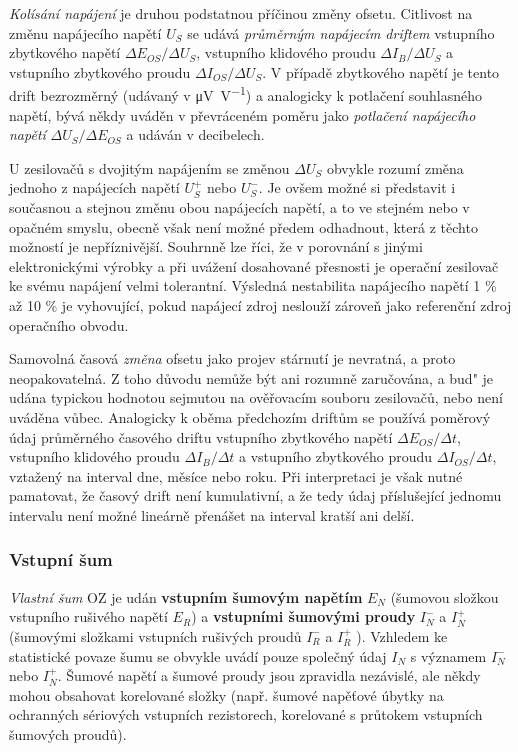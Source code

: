         \emph{Kolísání napájení} je druhou podstatnou příčinou změny ofsetu. Citlivost na změnu
        napájecího napětí \(U_S\) se udává \emph{průměrným napájecím driftem} vstupního zbytkového
        napětí \(\Delta E_{OS}/\Delta U_S\), vstupního klidového proudu \(\Delta I_B/\Delta U_S\) a
        vstupního zbytkového proudu \(\Delta I_{OS}/\Delta U_S\). V případě zbytkového napětí je
        tento drift bezrozměrný (udávaný v \si{\micro\volt\per\volt}) a analogicky k potlačení
        souhlasného napětí, bývá někdy uváděn v převráceném poměru jako \emph{potlačení napájecího
        napětí} \(\Delta U_S/\Delta E_{OS}\) a udáván v decibelech.

        U zesilovačů s dvojitým napájením se změnou \(\Delta U_S\) obvykle rozumí změna jednoho z
        napájecích napětí \(U_S^+\) nebo \(U_S^-\). Je ovšem možné si představit i současnou a
        stejnou změnu obou napájecích napětí, a to ve stejném nebo v opačném smyslu, obecně však
        není možné předem odhadnout, která z těchto možností je nepříznivější. Souhrnně lze říci, že
        v porovnání s jinými elektronickými výrobky a při uvážení dosahované přesnosti je operační
        zesilovač ke svému napájení velmi tolerantní. Výsledná nestabilita napájecího napětí 1 \% až
        10 \% je vyhovující, pokud napájecí zdroj neslouží zároveň jako referenční zdroj operačního
        obvodu.

        Samovolná časová \emph{změna} ofsetu jako projev stárnutí je nevratná, a proto
        neopakovatelná. Z toho důvodu nemůže být ani rozumně zaručována, a bud" je udána typickou
        hodnotou sejmutou na ověřovacím souboru zesilovačů, nebo není uváděna vůbec. Analogicky k
        oběma předchozím driftům se používá poměrový údaj průměrného časového driftu vstupního
        zbytkového napětí \(\Delta E_{OS}/\Delta t\), vstupního klidového proudu \(\Delta I_B/\Delta
        t\) a vstupního zbytkového proudu \(\Delta I_{OS}/\Delta t\), vztažený na interval dne,
        měsíce nebo roku. Při interpretaci je však nutné pamatovat, že časový drift není
        kumulativní, a že tedy údaj příslušející jednomu intervalu není možné lineárně přenášet na
        interval kratší ani delší.

      \subsubsection{Vstupní šum}\label{aesIchIIIsecIIssecIV}
        \emph{Vlastní šum} OZ je udán \textbf{vstupním šumovým napětím} \(E_N\) (šumovou složkou
        vstupního rušivého napětí \(E_R\)) a \textbf{vstupními šumovými proudy} \(I_N^-\) a \(I_N^+\)
        (šumovými složkami vstupních rušivých proudů \(I_R^-\) a \(I_R^+\) ). Vzhledem ke statistické
        povaze šumu se obvykle uvádí pouze společný údaj \(I_N\) s významem \(I_N^-\) nebo \(I_N^+\).
        Šumové napětí a šumové proudy jsou zpravidla nezávislé, ale někdy mohou obsahovat korelované
        složky (např. šumové napěťové úbytky na ochranných sériových vstupních rezistorech, korelované
        s průtokem vstupních šumových proudů).
        
